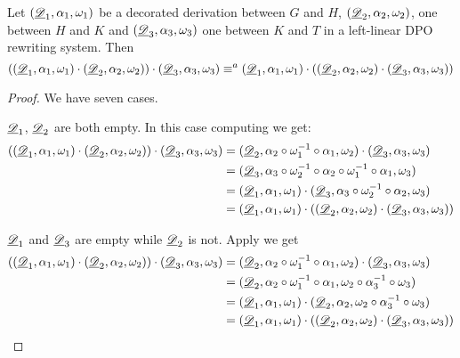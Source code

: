 \begin{lemma}\label{lem:ass}  
Let $(\underline{\mathscr{D}}_1, \alpha_1, \omega_1)$ be a decorated derivation between $G$ and $H$, $(\underline{\mathscr{D}}_2, \alpha_2, \omega_2)$, one between $H$ and $K$ and $(\underline{\mathscr{D}}_3, \alpha_3, \omega_3)$ one between $K$ and $T$ in a left-linear DPO rewriting system. Then
\[((\underline{\mathscr{D}}_1, \alpha_1, \omega_1)\cdot (\underline{\mathscr{D}}_2, \alpha_2, \omega_2)) \cdot (\underline{\mathscr{D}}_3, \alpha_3, \omega_3) \equiv^a (\underline{\mathscr{D}}_1, \alpha_1, \omega_1)\cdot ( (\underline{\mathscr{D}}_2, \alpha_2, \omega_2)\cdot (\underline{\mathscr{D}}_3, \alpha_3, \omega_3))\]
\end{lemma}
\begin{proof} We have seven cases.
	
\smallskip \noindent  $\underline{\mathscr{D}}_1$, $\underline{\mathscr{D}}_2$ are both empty.
In this case computing we get:
\begin{align*}
	((\underline{\mathscr{D}}_1, \alpha_1, \omega_1)\cdot (\underline{\mathscr{D}}_2, \alpha_2, \omega_2)) \cdot (\underline{\mathscr{D}}_3, \alpha_3, \omega_3)&=(\underline{\mathscr{D}}_2, \alpha_2\circ \omega^{-1}_1 \circ \alpha_1, \omega_2)\cdot (\underline{\mathscr{D}}_3, \alpha_3,\omega_3)\\&=(\underline{\mathscr{D}}_3,\alpha_3\circ\omega^{-1}_2\circ \alpha_2\circ \omega^{-1}_1\circ \alpha_1 ,\omega_3)\\&=(\underline{\mathscr{D}}_1, \alpha_1, \omega_1) \cdot (\underline{\mathscr{D}}_3, \alpha_3\circ \omega^{-1}_2 \circ \alpha_2,\omega_3)\\&=(\underline{\mathscr{D}}_1, \alpha_1, \omega_1) \cdot ((\underline{\mathscr{D}}_2, \alpha_2, \omega_2)\cdot (\underline{\mathscr{D}}_3, \alpha_3, \omega_3))
\end{align*}


\smallskip \noindent $\underline{\mathscr{D}}_1$ and $\underline{\mathscr{D}}_3$ are empty while $\underline{\mathscr{D}}_2$ is not. Apply  we get
\begin{align*}
((\underline{\mathscr{D}}_1, \alpha_1, \omega_1)\cdot (\underline{\mathscr{D}}_2, \alpha_2, \omega_2)) \cdot (\underline{\mathscr{D}}_3, \alpha_3, \omega_3)&=(\underline{\mathscr{D}}_2, \alpha_2\circ \omega^{-1}_1 \circ \alpha_1, \omega_2)\cdot (\underline{\mathscr{D}}_3, \alpha_3,\omega_3)\\&=(\underline{\mathscr{D}}_2, \alpha_2\circ \omega^{-1}_1 \circ \alpha_1, \omega_2\circ \alpha^{-1}_3 \circ \omega_3)\\&=(\underline{\mathscr{D}}_1, \alpha_1, \omega_1 )\cdot  (\underline{\mathscr{D}}_2, \alpha_2,\omega_2\circ \alpha^{-1}_3 \circ  \omega_3)\\&= (\underline{\mathscr{D}}_1, \alpha_1, \omega_1 )\cdot((\underline{\mathscr{D}}_2, \alpha_2, \omega_2)\cdot (\underline{\mathscr{D}}_3, \alpha_3, \omega_3) )
\end{align*}



\end{proof}

